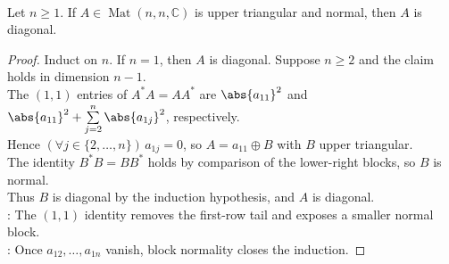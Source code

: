 \begin{lemma} \label{lem:upper-triangular-normal-matrix-is-diagonal} \\
Let $n\geq1$. If $A\in\operatorname{Mat}(n,n,\mathbb{C})$ is upper triangular and normal, then $A$ is diagonal.
\begin{proof}
Induct on $n$. If $n=1$, then $A$ is diagonal. Suppose $n\geq2$ and the claim holds in dimension $n-1$.\\
The $(1,1)$ entries of $A^*A=AA^*$ are $\abs{a_{11}}^2$ and $\abs{a_{11}}^2+\sum\limits_{j=2}^{n}\abs{a_{1j}}^2$, respectively.\\
Hence $(\forall j\in\{2,\ldots,n\})\,a_{1j}=0$, so $A=a_{11}\oplus B$ with $B$ upper triangular.\\
The identity $B^*B=BB^*$ holds by comparison of the lower-right blocks, so $B$ is normal.\\
Thus $B$ is diagonal by the induction hypothesis, and $A$ is diagonal.\\
: The $(1,1)$ identity removes the first-row tail and exposes a smaller normal block.\\
: Once $a_{12},\ldots,a_{1n}$ vanish, block normality closes the induction.
\end{proof}
\end{lemma}

